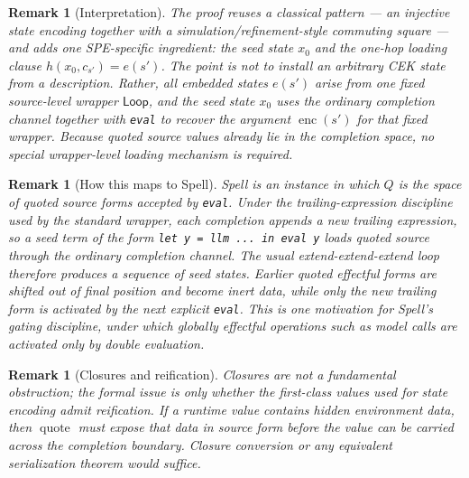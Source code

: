 \documentclass[11pt]{article}
\newtheorem{remark}[definition]{Remark}
\newcommand{\quoteop}{\operatorname{quote}}
\newcommand{\enc}{\operatorname{enc}}
\begin{document}
\begin{remark}[Interpretation]
The proof reuses a classical pattern --- an injective state encoding together with a simulation/refinement-style commuting square \cite{AbadiLamport91,LynchVaandrager95,SegalaLynch95} --- and adds one SPE-specific ingredient: the seed state $x_0$ and the one-hop loading clause $h(x_0,c_{s'})=e(s')$. The point is not to install an arbitrary CEK state from a description. Rather, all embedded states $e(s')$ arise from one fixed source-level wrapper $\mathsf{Loop}$, and the seed state $x_0$ uses the ordinary completion channel together with \texttt{eval} to recover the argument $\enc(s')$ for that fixed wrapper. Because quoted source values already lie in the completion space, no special wrapper-level loading mechanism is required.
\end{remark}

\begin{remark}[How this maps to Spell]
Spell is an instance in which $Q$ is the space of quoted source forms accepted by \texttt{eval}. Under the trailing-expression discipline used by the standard wrapper, each completion appends a new trailing expression, so a seed term of the form \texttt{let y = llm ... in eval y} loads quoted source through the ordinary completion channel. The usual extend-extend-extend loop therefore produces a sequence of seed states. Earlier quoted effectful forms are shifted out of final position and become inert data, while only the new trailing form is activated by the next explicit \texttt{eval}. This is one motivation for Spell's gating discipline, under which globally effectful operations such as model calls are activated only by double evaluation.
\end{remark}

\begin{remark}[Closures and reification]
Closures are not a fundamental obstruction; the formal issue is only whether the first-class values used for state encoding admit reification. If a runtime value contains hidden environment data, then $\quoteop$ must expose that data in source form before the value can be carried across the completion boundary. Closure conversion or any equivalent serialization theorem would suffice.
\end{remark}
\end{document}
